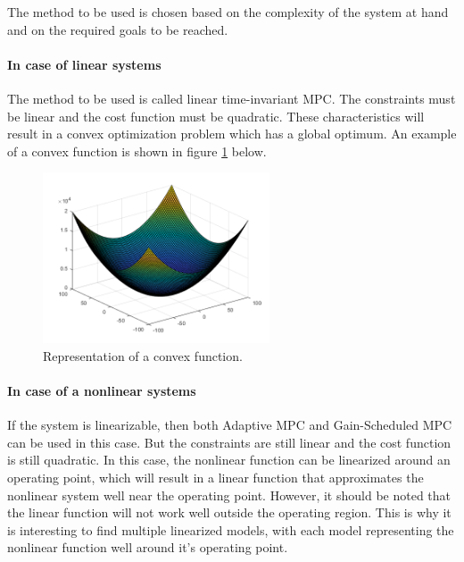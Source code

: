 \documentclass{thesisreport}
\begin{document}
\noindent The method to be used is chosen based on the complexity of the system at hand and on the required goals to be reached. 

\paragraph{In case of linear systems} The method to be used is called linear time-invariant MPC. The constraints must be linear and the cost function must be quadratic. These characteristics will result in a convex optimization problem \cite{ZEMAN2003325} which has a global optimum. An example of a convex function is shown in figure \ref{convex_function} below.

\begin{figure}[h]
\centering
\includegraphics[width=0.6\textwidth]{Images/Control/MPC_Convex_Equation}
\caption{Representation of a convex function.}
\label{convex_function}
\end{figure}

\paragraph{In case of a nonlinear systems} If the system is linearizable, then both Adaptive MPC and Gain-Scheduled MPC can be used in this case. But the constraints are still linear and the cost function is still quadratic. In this case, the nonlinear function can be linearized around an operating point, which will result in a linear function that approximates the nonlinear system well near the operating point. However, it should be noted that the linear function will not work well outside the operating region. This is why it is interesting to find multiple linearized models, with each model representing the nonlinear function well around it's operating point.
\end{document}
